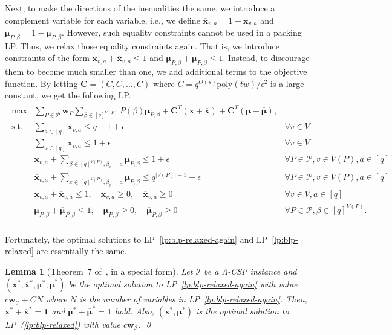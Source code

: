 \documentclass[letterpaper, 11pt]{article}
\newtheorem{lemma}[theorem]{Lemma}
\newcommand{\calI}{\mathcal{I}}
\newcommand{\calP}{\mathcal{P}}
\newcommand{\biC}{\boldsymbol{C}}
\newcommand{\biw}{\boldsymbol{w}}
\newcommand{\bix}{\boldsymbol{x}}
\newcommand{\bimu}{\boldsymbol{\mu}}
\newcommand{\poly}{\mathrm{poly}}
\begin{document}
Next, 
to make the directions of the inequalities the same,
we introduce a complement variable for each variable, i.e., we define $\overline{\bix}_{v,a}=1-\bix_{v,a}$ and $\overline{\bimu}_{P,\beta}=1-\bimu_{P,\beta}$.
However, such equality constraints cannot be used in a packing LP.
Thus, we relax those equality constraints again.
That is, we introduce constraints of the form $\bix_{v,a}+\overline{\bix}_{v,a}\leq 1$ and $\bimu_{P,\beta}+\overline{\bimu}_{P,\beta}\leq 1$.
Instead, to discourage them to become much smaller than one, 
we add additional terms to the objective function.
By letting $\biC=(C,C,\ldots,C)$ where $C=q^{O(s)}\poly(tw)/\epsilon^2$ is a large constant, we get the following LP.
\begin{eqnarray}
  \begin{array}{lll}
    \max & \sum\limits_{P\in \calP}\biw_P \sum\limits_{\beta\in [q]^{V(P)}}P(\beta)\bimu_{P,\beta} + \biC^T(\bix+\overline{\bix})+ \biC^T(\bimu+\overline{\bimu}),\\
    \mbox{s.t.} & \sum\limits_{a\in[q]}\bix_{v,a} \leq q-1 + \epsilon & \forall v\in V\\    
    & \sum\limits_{a\in[q]}\overline{\bix}_{v,a} \leq 1+\epsilon & \forall v\in V\\    
    & \bix_{v,a}+\sum\limits_{\beta \in [q]^{V(P)}, \beta_v=a}\bimu_{P,\beta} \leq 1+\epsilon & \forall P\in \calP, v\in V(P), a\in [q]\\
    & \overline{\bix}_{v,a}+\sum\limits_{x \in [q]^{V(P)}, \beta_v=a}\overline{\bimu}_{P,\beta} \leq q^{|V(P)|-1}+\epsilon & \forall P\in \calP, v\in V(P), a\in [q]\\
    & \bix_{v,a}+\overline{\bix}_{v,a} \leq 1, \quad \bix_{v,a}\geq 0, \quad \overline{\bix}_{v,a}\geq 0 & \forall v \in V, a\in[q]\\
    & \bimu_{P,\beta}+\overline{\bimu}_{P,\beta} \leq 1, \quad \bimu_{P,\beta}\geq 0, \quad \overline{\bimu}_{P,\beta}\geq 0 & \forall P\in \calP, \beta\in [q]^{V(P)}.\\
  \end{array}
  \label{lp:blp-relaxed-again}
\end{eqnarray}

Fortunately, 
the optimal solutions to LP~\eqref{lp:blp-relaxed-again} and LP~\eqref{lp:blp-relaxed} are essentially the same.
\begin{lemma}[Theorem~7 of~\cite{FS97}, in a special form]\label{lmm:fs97}
  Let $\calI$ be a $\Lambda$-CSP instance and $(\bix^*,\overline{\bix}^*,\bimu^*,\overline{\bimu}^*)$ be the optimal solution to LP~\eqref{lp:blp-relaxed-again} with value $c\biw_{\calI}+CN$ where $N$ is the number of variables in LP~\eqref{lp:blp-relaxed-again}.
  Then, $\bix^*+\overline{\bix}^*=\mathbf{1}$ and $\bimu^*+\overline{\bimu}^*=\mathbf{1}$ hold.
  Also, $(\bix^*,\bimu^*)$ is the optimal solution to LP~(\ref{lp:blp-relaxed}) with value $c\biw_{\calI}$.
  \qed
\end{lemma}
\end{document}
